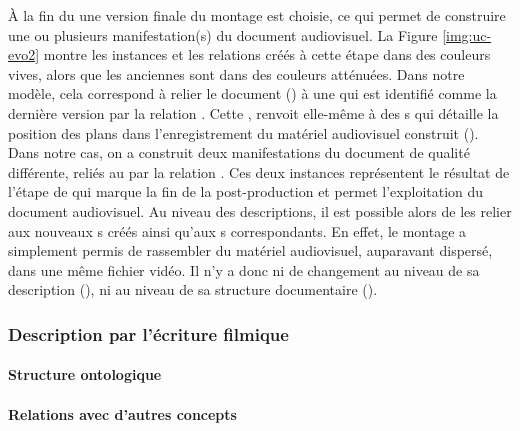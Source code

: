 \begin{liste}
	\item À la fin du  une version finale du montage est choisie, ce qui permet de construire une ou plusieurs manifestation(s) du document audiovisuel. 
	La Figure \ref{img:uc-evo2} montre les instances et les relations créés à cette étape dans des couleurs vives, alors que les anciennes sont dans des couleurs atténuées.
	Dans notre modèle, cela correspond à relier le document () à une  qui est identifié comme la dernière version par la relation .
	Cette , renvoit elle-même à des s qui détaille la position des plans dans l'enregistrement du matériel audiovisuel construit (). 
	Dans notre cas, on a construit deux manifestations du document de qualité différente, reliés au  par la relation .
	Ces deux instances représentent le résultat de l'étape de  qui marque la fin de la post-production et permet l'exploitation du document audiovisuel.
	Au niveau des descriptions, il est possible alors de les relier aux nouveaux s créés ainsi qu'aux s correspondants.
	En effet, le montage a simplement permis de rassembler du matériel audiovisuel, auparavant dispersé, dans une même fichier vidéo. 
	Il n'y a donc ni de changement au niveau de sa description (), ni au niveau de sa structure documentaire ().
\end{liste}
















\subsubsection{Description par l'écriture filmique}\label{sec:annotation}
\paragraph{Structure ontologique}
\paragraph{Relations avec d'autres concepts}



